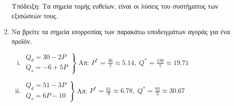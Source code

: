 \documentclass[a4paper,table]{report}
\begin{document}
\begin{enumerate}
    \textcolor{Col1}{Υπόδειξη:} Τα σημεία τομής ευθείων, είναι οι λύσεις του συστήματος 
    των εξισώσεών τους.

  \item Να βρείτε τα σημεία ισορροπίας των παρακάτω υποδειγμάτων αγοράς για ένα προϊόν.
    \begin{enumerate}[i),itemsep=\baselineskip]
      \item $ 
        \left.
          \begin{matrix}
            Q_{d} = 30-2P \\
            Q_{s} = -6+5P
          \end{matrix} 
        \right\}$ 
        \hfill Απ: $ P^{*} = \frac{36}{7} \approx 5.14, \; Q^{*}= \frac{138}{7} 
        \approx 19.71 $

      \item $ 
        \left.
          \begin{matrix}
            Q_{d} = 51 - 3P \\
            Q_{s} = 6P - 10
          \end{matrix} 
        \right\}$ 
        \hfill Απ: $ P^{*} = \frac{61}{9} \approx 6.78, \; Q^{*}= \frac{92}{3} \approx
        30.67 $

    \end{enumerate}
\end{enumerate}
\end{document}
